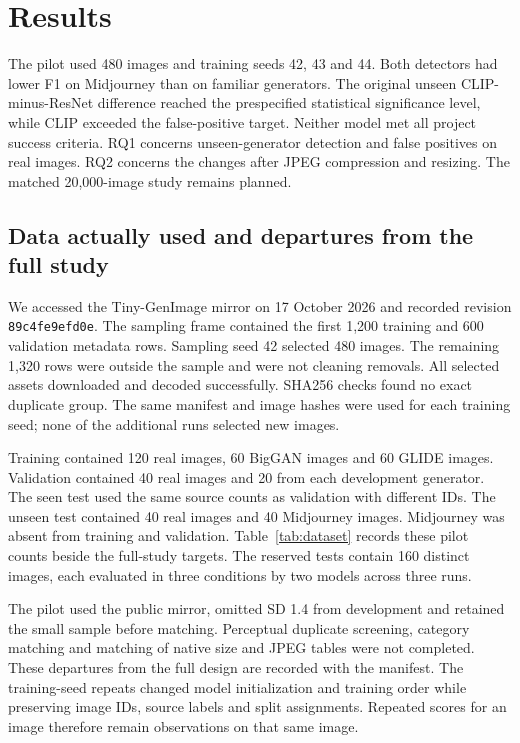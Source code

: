 \section{Results}
\label{sec:results}
The pilot used 480 images and training seeds 42, 43 and 44. Both detectors had lower F1 on Midjourney than on familiar generators. The original unseen CLIP-minus-ResNet difference reached the prespecified statistical significance level, while CLIP exceeded the false-positive target. Neither model met all project success criteria. RQ1 concerns unseen-generator detection and false positives on real images. RQ2 concerns the changes after JPEG compression and resizing. The matched 20,000-image study remains planned.

\subsection{Data actually used and departures from the full study}
\label{sec:results-data}
We accessed the Tiny-GenImage mirror \citep{tinygen2026} on 17 October 2026 and recorded revision \texttt{89c4fe9efd0e}. The sampling frame contained the first 1,200 training and 600 validation metadata rows. Sampling seed 42 selected 480 images. The remaining 1,320 rows were outside the sample and were not cleaning removals. All selected assets downloaded and decoded successfully. SHA256 checks found no exact duplicate group. The same manifest and image hashes were used for each training seed; none of the additional runs selected new images.

Training contained 120 real images, 60 BigGAN images and 60 GLIDE images. Validation contained 40 real images and 20 from each development generator. The seen test used the same source counts as validation with different IDs. The unseen test contained 40 real images and 40 Midjourney images. Midjourney was absent from training and validation. Table~\ref{tab:dataset} records these pilot counts beside the full-study targets. The reserved tests contain 160 distinct images, each evaluated in three conditions by two models across three runs.



The pilot used the public mirror, omitted SD 1.4 from development and retained the small sample before matching. Perceptual duplicate screening, category matching and matching of native size and JPEG tables were not completed. These departures from the full design are recorded with the manifest. The training-seed repeats changed model initialization and training order while preserving image IDs, source labels and split assignments. Repeated scores for an image therefore remain observations on that same image.


